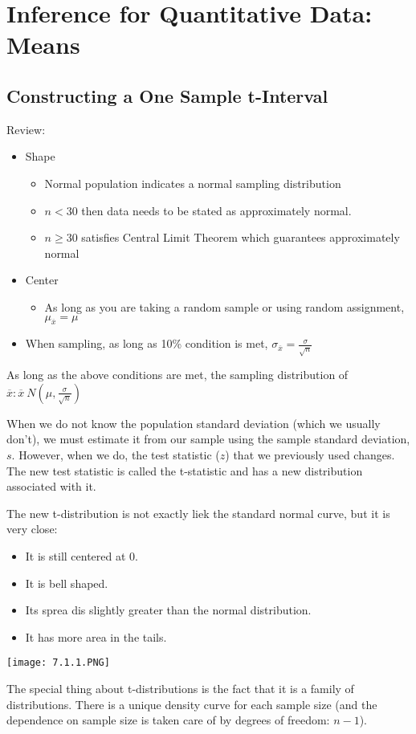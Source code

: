 \documentclass[../stats.tex]{subfiles}
\begin{document}
\chapter{Inference for Quantitative Data: Means}
\section{Constructing a One Sample t-Interval}
Review:
\begin{itemize}
    \item Shape 
    \begin{itemize}
        \item Normal population indicates a normal sampling distribution 
        \item $n<30$ then data needs to be stated as approximately normal.
        \item $n\geq 30$ satisfies Central Limit Theorem which guarantees approximately normal 
    \end{itemize}
    \item Center 
    \begin{itemize}
        \item As long as you are taking a random sample or using random assignment, $\mu_{\overline{x}}=\mu$
    \end{itemize}
    \item When sampling, as long as 10\% condition is met, $\sigma_{\overline{x}}=\frac{\sigma}{\sqrt{n}}$
\end{itemize}

As long as the above conditions are met, the sampling distribution of $\overline{x}: \overline{x}~N\left(\mu,\frac{\sigma}{\sqrt{n}}\right)$

When we do not know the population standard deviation (which we usually don't), we must estimate it from our sample using the sample standard deviation, $s$. However, when we do, the test 
statistic ($z$) that we previously used changes. The new test statistic is called the t-statistic and has a new distribution associated with it.

The new t-distribution is not exactly liek the standard normal curve, but it is very close:
\begin{itemize}
    \item It is still centered at 0.
    \item It is bell shaped.
    \item Its sprea dis slightly greater than the normal distribution.
    \item It has more area in the tails.
\end{itemize}
\begin{center}
    \texttt{[image: 7.1.1.PNG]}
\end{center}
The special thing about t-distributions is the fact that it is a family of distributions. There is a unique density curve for each sample size (and the dependence on sample size is taken care of by degrees of freedom: $n-1$).
\end{document}
